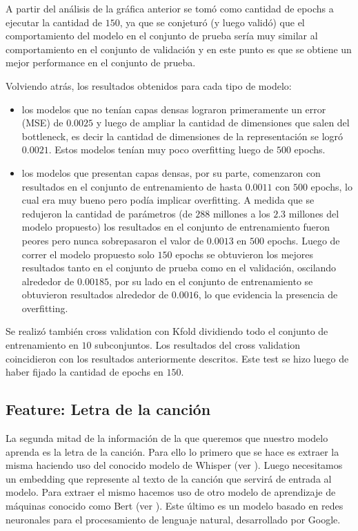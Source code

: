 \documentclass[colorinlistoftodos,twoside,twocolumn,10pt]{article} %
\begin{document}
A partir del análisis de la gráfica anterior se tomó como cantidad de epochs a ejecutar la cantidad de $150$, ya que se conjeturó (y luego validó) que el comportamiento del modelo en el conjunto de prueba sería muy similar al comportamiento en el conjunto de validación y en este punto es que se obtiene un mejor performance en el conjunto de prueba. 

Volviendo atrás, los resultados obtenidos para cada tipo de modelo:
\begin{itemize}
	\item los modelos que no tenían capas densas lograron primeramente un error (MSE) de $0.0025$ y luego de ampliar la   cantidad de dimensiones que salen del bottleneck, es decir la cantidad de dimensiones de la representación se logró $0.0021$. Estos modelos tenían muy poco overfitting luego de $500$ epochs.
	\item los modelos que presentan capas densas, por su parte, comenzaron con resultados en el conjunto de entrenamiento de hasta $0.0011$ con $500$ epochs, lo cual era muy bueno pero podía implicar overfitting. A medida que se redujeron la cantidad de parámetros (de $288$ millones a los $2.3$ millones del modelo propuesto) los resultados en el conjunto de entrenamiento fueron peores pero nunca sobrepasaron el valor de $0.0013$ en $500$ epochs. Luego de correr el modelo propuesto solo $150$ epochs se obtuvieron los mejores resultados tanto en el conjunto de prueba como en el validación, oscilando alrededor de $0.00185$, por su lado en el conjunto de entrenamiento se obtuvieron resultados alrededor de $0.0016$, lo que evidencia la presencia de overfitting.
\end{itemize}

Se realizó también cross validation con Kfold dividiendo todo el conjunto de entrenamiento en $10$ subconjuntos. Los resultados del cross validation coincidieron con los resultados anteriormente descritos. Este test se hizo luego de haber fijado la cantidad de epochs en $150$.

\subsection{Feature: Letra de la canci\'on}

La segunda mitad de la informaci\'on de la que queremos que nuestro modelo aprenda es la letra de la canci\'on. Para ello lo primero que se hace es extraer la misma haciendo uso del conocido modelo de Whisper (ver \cite{whisper}). Luego necesitamos un embedding que represente al texto de la canci\'on que servir\'a de entrada al modelo. Para extraer el mismo hacemos uso de otro modelo de aprendizaje de m\'aquinas conocido como Bert (ver \cite{bert}). Este \'ultimo es un modelo basado en redes neuronales para el procesamiento de lenguaje natural, desarrollado por Google.
\end{document}
